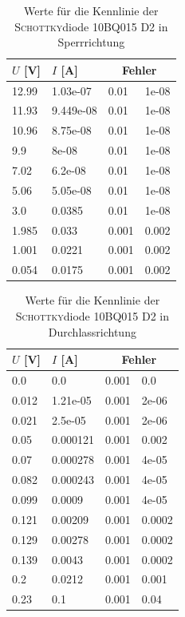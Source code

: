 \documentclass[a4paper,10pt]{article}
\numberwithin{equation}{section}
\begin{document}
\begin{table}[h]
        \centering
\begin{tabular}{ llll }
        $U$ [V] & $I$ [A] & \multicolumn{2}{c}{Fehler}\\
	\hline
	 12.99  &  1.03e-07  &  0.01  &  1e-08 \\
	 11.93  &  9.449e-08  &  0.01  &  1e-08 \\
	 10.96  &  8.75e-08  &  0.01  &  1e-08 \\
	 9.9  &  8e-08  &  0.01  &  1e-08 \\
	 7.02  &  6.2e-08  &  0.01  &  1e-08 \\
	 5.06  &  5.05e-08  &  0.01  &  1e-08 \\
	 3.0  &  0.0385  &  0.01  &  1e-08 \\
	 1.985  &  0.033  &  0.001  &  0.002 \\
	 1.001  &  0.0221  &  0.001  &  0.002 \\
	 0.054  &  0.0175  &  0.001  &  0.002
\end{tabular}
        \caption{Werte für die Kennlinie der \textsc{Schottky}diode 10BQ015 D2 in Sperrrichtung}
\end{table}
\begin{table}[h]
        \centering
\begin{tabular}{ llll }
        $U$ [V] & $I$ [A] & \multicolumn{2}{c}{Fehler}\\
	\hline
	 0.0  &  0.0  &  0.001  &  0.0 \\
	 0.012  &  1.21e-05  &  0.001  &  2e-06 \\
	 0.021  &  2.5e-05  &  0.001  &  2e-06 \\
	 0.05  &  0.000121  &  0.001  &  0.002 \\
	 0.07  &  0.000278  &  0.001  &  4e-05 \\
	 0.082  &  0.000243  &  0.001  &  4e-05 \\
	 0.099  &  0.0009  &  0.001  &  4e-05 \\
	 0.121  &  0.00209  &  0.001  &  0.0002 \\
	 0.129  &  0.00278  &  0.001  &  0.0002 \\
	 0.139  &  0.0043  &  0.001  &  0.0002 \\
	 0.2  &  0.0212  &  0.001  &  0.001 \\
	 0.23  &  0.1  &  0.001  &  0.04
\end{tabular}
        \caption{Werte für die Kennlinie der \textsc{Schottky}diode 10BQ015 D2 in Durchlassrichtung}
\end{table}
\end{document}
